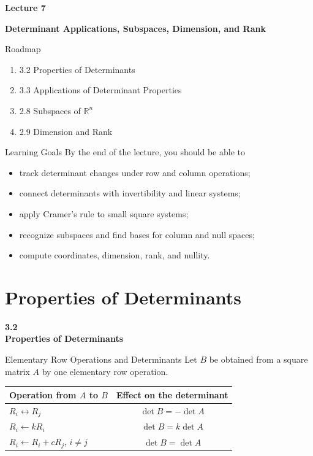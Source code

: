 \documentclass[aspectratio=169]{beamer}
\newcommand{\R}{\mathbb{R}}
\newcommand{\sectioncard}[2]{%
  \begin{frame}[plain]
    \vfill\centering
    {\Huge\color{lectureorange}\bfseries #1\\[1ex]#2}
    \vfill
  \end{frame}}
\begin{document}
\begin{frame}[plain]
  \vfill
  {\Huge\color{lecturegreen}\bfseries Lecture 7}
  \bigskip

  {\LARGE\color{lecturegreen}\bfseries Determinant Applications, Subspaces, Dimension, and Rank}
  \vfill
\end{frame}

\begin{frame}{Roadmap}
  \begin{enumerate}
    \item 3.2 Properties of Determinants
    \item 3.3 Applications of Determinant Properties
    \item 2.8 Subspaces of $\R^n$
    \item 2.9 Dimension and Rank
  \end{enumerate}
\end{frame}

\begin{frame}{Learning Goals}
  By the end of the lecture, you should be able to
  \begin{itemize}
    \item track determinant changes under row and column operations;
    \item connect determinants with invertibility and linear systems;
    \item apply Cramer's rule to small square systems;
    \item recognize subspaces and find bases for column and null spaces;
    \item compute coordinates, dimension, rank, and nullity.
  \end{itemize}
\end{frame}

\section[Determinant Properties]{Properties of Determinants}
\sectioncard{3.2}{Properties of Determinants}

\begin{frame}{Elementary Row Operations and Determinants}
Let $B$ be obtained from a square matrix $A$ by one elementary row operation.
\renewcommand{\arraystretch}{1.35}
\begin{center}
\begin{tabular}{>{\raggedright\arraybackslash}p{.47\linewidth}c}
\toprule
Operation from $A$ to $B$ & Effect on the determinant \\
\midrule
$R_i\leftrightarrow R_j$ & $\det B=-\det A$ \\
$R_i\leftarrow kR_i$ & $\det B=k\det A$ \\
$R_i\leftarrow R_i+cR_j$, $i\ne j$ & $\det B=\det A$ \\
\bottomrule
\end{tabular}
\end{center}
\end{frame}
\end{document}
